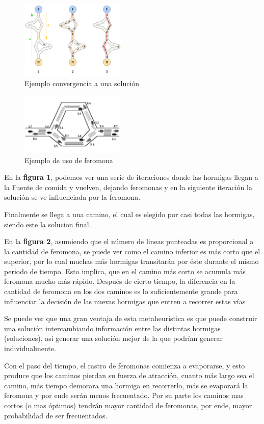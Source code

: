 \begin{figure}[h]
\centering
\caption{Ejemplo convergencia a una solución}
\includegraphics[width=5cm]{imagenes/feromona}
\end{figure}

\begin{figure}[h]
\caption{Ejemplo de uso de feromona}
\centering
\includegraphics[width=5cm]{imagenes/feromona2}
\end{figure}

En la \textbf{figura 1}, podemos ver una serie de iteraciones donde las hormigas llegan a la Fuente de comida y vuelven, dejando feromonas y en la siguiente iteración la solución se ve influenciada por la feromona. 

Finalmente se llega a una camino, el cual es elegido por casi todas las hormigas, siendo este la solucion final.

En la \textbf{figura 2}, asumiendo que el número de lineas punteadas es proporcional a la cantidad de feromona, se puede ver como el camino inferior es más corto que el superior, por lo cual muchas más hormigas transitarán por éste durante el mismo periodo de tiempo. Esto implica, que en el camino más corto se acumula más feromona mucho más rápido. Después de cierto tiempo, la diferencia en la cantidad de feromona en los dos caminos es lo suficientemente grande para influenciar la decisión de las nuevas hormigas que entren a recorrer estas vías

Se puede ver que una gran ventaja de esta metaheurística es que puede construir una solución intercambiando información entre las distintas hormigas (soluciones), así generar una solución mejor de la que podrían generar individualmente.

Con el paso del tiempo, el rastro de feromonas comienza a evaporarse, y esto produce que los caminos pierdan su fuerza de atracción, cuanto más largo sea el camino, más tiempo demorara una hormiga en recorrerlo, más se evaporará la feromona y por ende serán menos frecuentado. Por su parte los caminos mas cortos (o mas óptimos) tendrán mayor cantidad de feromonas, por ende, mayor probabilidad de ser frecuentados.

